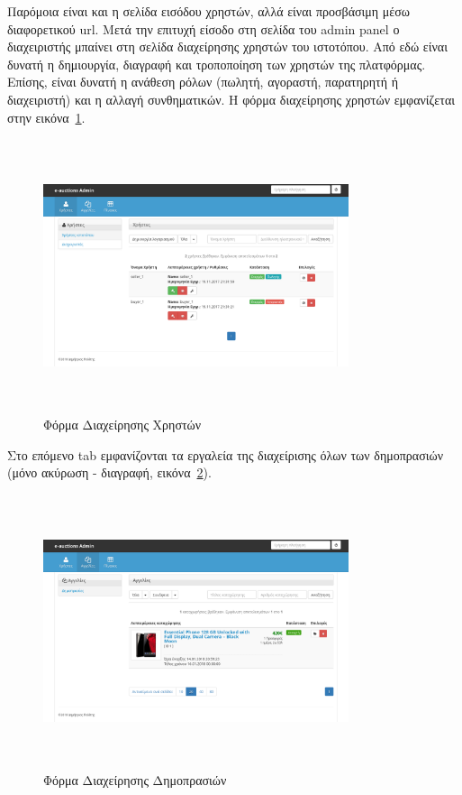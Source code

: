 \documentclass[12pt]{report}
\begin{document}
Παρόμοια είναι και η σελίδα εισόδου χρηστών, αλλά είναι προσβάσιμη μέσω διαφορετικού \textlatin{url}. Μετά την επιτυχή είσοδο στη σελίδα του \textlatin{admin panel} ο διαχειριστής μπαίνει στη σελίδα διαχείρησης χρηστών του ιστοτόπου. Από εδώ είναι δυνατή η δημιουργία, διαγραφή και τροποποίηση των χρηστών της πλατφόρμας. Επίσης, είναι δυνατή η ανάθεση ρόλων (πωλητή, αγοραστή, παρατηρητή ή διαχειριστή) και η αλλαγή συνθηματικών. Η φόρμα διαχείρησης χρηστών εμφανίζεται στην εικόνα~\ref{fig:user_admin}.
\begin{figure}[H]
\centering
\includegraphics[width=0.8\textwidth, height=8cm]{Screenshot-2018-1-14-e-auctions-Admin-2}
\caption{Φόρμα Διαχείρησης Χρηστών}
\label{fig:user_admin}
\end{figure}

Στο επόμενο \textlatin{tab} εμφανίζονται τα εργαλεία της διαχείρισης όλων των δημοπρασιών (μόνο ακύρωση - διαγραφή, εικόνα~\ref{fig:auction_admin}).
\begin{figure}[H]
\centering
\includegraphics[width=0.8\textwidth, height=8cm]{Screenshot-2018-1-14-e-auctions-Admin-3}
\caption{Φόρμα Διαχείρησης Δημοπρασιών}
\label{fig:auction_admin}
\end{figure}
\end{document}
